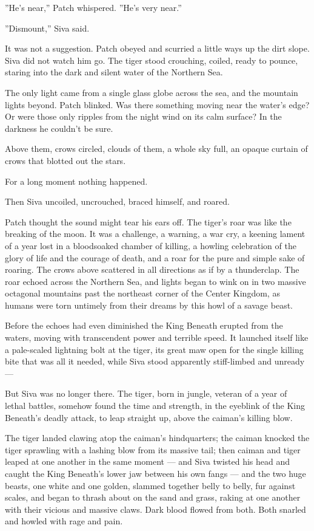 \documentclass[12pt]{book}
\begin{document}
''He's near,'' Patch whispered. ''He's very near.''

''Dismount,'' Siva said.

It was not a suggestion. Patch obeyed and scurried a little ways up
the dirt slope. Siva did not watch him go. The tiger stood crouching,
coiled, ready to pounce, staring into the dark and silent water of the
Northern Sea.

The only light came from a single glass globe across the sea, and the
mountain lights beyond. Patch blinked. Was there something moving near
the water's edge? Or were those only ripples from the night wind on
its calm surface? In the darkness he couldn't be sure.

Above them, crows circled, clouds of them, a whole sky full, an opaque
curtain of crows that blotted out the stars.

For a long moment nothing happened.

Then Siva uncoiled, uncrouched, braced himself, and roared.

Patch thought the sound might tear his ears off. The tiger's roar was
like the breaking of the moon. It was a challenge, a warning, a war
cry, a keening lament of a year lost in a bloodsoaked chamber of
killing, a howling celebration of the glory of life and the courage of
death, and a roar for the pure and simple sake of roaring. The crows
above scattered in all directions as if by a thunderclap. The roar
echoed across the Northern Sea, and lights began to wink on in two
massive octagonal mountains past the northeast corner of the Center
Kingdom, as humans were torn untimely from their dreams by this howl
of a savage beast.

Before the echoes had even diminished the King Beneath erupted from
the waters, moving with transcendent power and terrible speed. It
launched itself like a pale-scaled lightning bolt at the tiger, its
great maw open for the single killing bite that was all it needed,
while Siva stood apparently stiff-limbed and unready ---

But Siva was no longer there. The tiger, born in jungle, veteran of a
year of lethal battles, somehow found the time and strength, in the
eyeblink of the King Beneath's deadly attack, to leap straight up,
above the caiman's killing blow.

The tiger landed clawing atop the caiman's hindquarters; the caiman
knocked the tiger sprawling with a lashing blow from its massive tail;
then caiman and tiger leaped at one another in the same moment --- and
Siva twisted his head and caught the King Beneath's lower jaw between
his own fangs --- and the two huge beasts, one white and one golden,
slammed together belly to belly, fur against scales, and began to
thrash about on the sand and grass, raking at one another with their
vicious and massive claws. Dark blood flowed from both. Both snarled
and howled with rage and pain.
\end{document}
